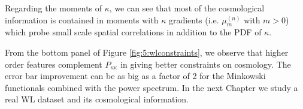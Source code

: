 Regarding the moments of $\kappa$, we can see that most of the cosmological information is contained in moments with $\kappa$ gradients (i.e. $\mu_{m}^{(n)}$ with $m>0$) which probe small scale spatial correlations in addition to the PDF of $\kappa$.

From the bottom panel of Figure \ref{fig:5:wlconstraints}, we observe that higher order features complement $P_{\kappa\kappa}$ in giving better constraints on cosmology. The error bar improvement can be as big as a factor of 2 for the Minkowski functionals combined with the power spectrum. In the next Chapter we study a real WL dataset and its cosmological information.      

%